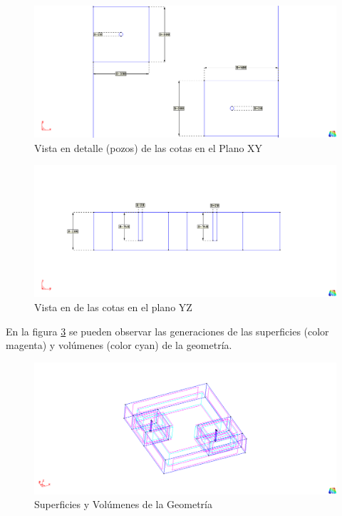 \documentclass[10pt,a4paper,final]{article}
\begin{document}
%
\begin{figure}[tbhp]
\centerline{\includegraphics[scale=0.6]{img/cotas_superiores_detallesXY}}
\caption{Vista en detalle (pozos) de las cotas en el Plano XY}
\label{cotas_superiores_detallesXY}
\end{figure}
%

%
\begin{figure}[tbhp]
\centerline{\includegraphics[scale=0.6]{img/cotas_grales_YZ}}
\caption{Vista en de las cotas en el plano YZ}
\label{cotas_grales_YZ}
\end{figure}
%
En la figura \ref{superficies_y_volumenes} se pueden observar las generaciones de las superficies (color magenta) y volúmenes (color cyan)
de la geometría.
%
\begin{figure}[tbhp]
\centerline{\includegraphics[scale=0.75]{img/superficies_y_volumenes}}
\caption{Superficies y Volúmenes de la Geometría}
\label{superficies_y_volumenes}
\end{figure}
%
\end{document}
